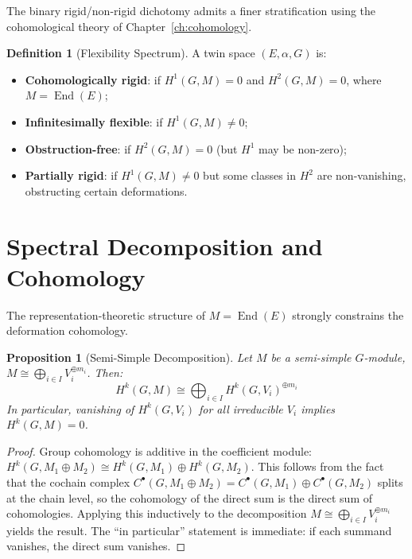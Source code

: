 \documentclass[11pt,a4paper,openany]{book}
\theoremstyle{plain}
\newtheorem{proposition}[theorem]{Proposition}
\theoremstyle{definition}
\newtheorem{definition}[theorem]{Definition}
\newcommand{\actspace}{E}
\newcommand{\groupG}{G}
\DeclareMathOperator{\End}{End}
\begin{document}
The binary rigid/non-rigid dichotomy admits a finer stratification using the cohomological theory of Chapter~\ref{ch:cohomology}.

\begin{definition}[Flexibility Spectrum]\label{def:flexibility}
A twin space $(\actspace, \alpha, \groupG)$ is:
\begin{itemize}
    \item \textbf{Cohomologically rigid}: if $H^1(\groupG, M) = 0$ and $H^2(\groupG, M) = 0$, where $M = \End(\actspace)$;
    \item \textbf{Infinitesimally flexible}: if $H^1(\groupG, M) \neq 0$;
    \item \textbf{Obstruction-free}: if $H^2(\groupG, M) = 0$ (but $H^1$ may be non-zero);
    \item \textbf{Partially rigid}: if $H^1(\groupG, M) \neq 0$ but some classes in $H^2$ are non-vanishing, obstructing certain deformations.
\end{itemize}
\end{definition}

\section{Spectral Decomposition and Cohomology}

The representation-theoretic structure of $M = \End(\actspace)$ strongly constrains the deformation cohomology.

\begin{proposition}[Semi-Simple Decomposition]\label{prop:semisimple}
Let $M$ be a semi-simple $\groupG$-module, $M \cong \bigoplus_{i \in I} V_i^{\oplus m_i}$. Then:
\[
H^k(\groupG, M) \cong \bigoplus_{i \in I} H^k(\groupG, V_i)^{\oplus m_i}
\]
In particular, vanishing of $H^k(\groupG, V_i)$ for all irreducible $V_i$ implies $H^k(\groupG, M) = 0$.
\end{proposition}

\begin{proof}
Group cohomology is additive in the coefficient module: $H^k(\groupG, M_1 \oplus M_2) \cong H^k(\groupG, M_1) \oplus H^k(\groupG, M_2)$. This follows from the fact that the cochain complex $C^\bullet(\groupG, M_1 \oplus M_2) = C^\bullet(\groupG, M_1) \oplus C^\bullet(\groupG, M_2)$ splits at the chain level, so the cohomology of the direct sum is the direct sum of cohomologies. Applying this inductively to the decomposition $M \cong \bigoplus_{i \in I} V_i^{\oplus m_i}$ yields the result. The ``in particular'' statement is immediate: if each summand vanishes, the direct sum vanishes.
\end{proof}
\end{document}
